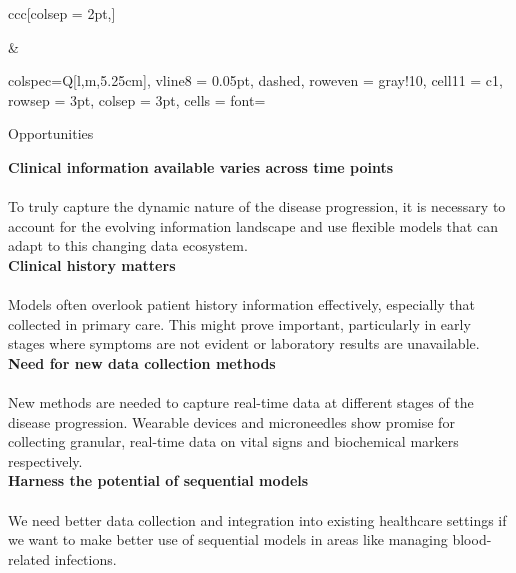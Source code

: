 \begin{table*}[h!]
\begin{tblr}{ccc}[colsep = 2pt,]
\begin{tblr}[T]
          \bottomrule
           
        \end{tblr}

        &

        
        \begin{tblr}[T]{
            colspec={Q[l,m,5.25cm]},
            vline{8} = {0.05pt, dashed},
            row{even} = {gray!10},
            cell{1}{1} = {c1},
            rowsep = 3pt,
            colsep = 3pt,
            cells = {font=\fontsize{7}{8}\linespread{1.00}\selectfont}
         }

            \toprule
             Opportunities \\
            \midrule
            
            {\textbf{Clinical information available varies across time points} \\ \vspace{0.1cm} \\ To truly capture the dynamic nature of the disease progression, it is necessary to account for the evolving information landscape and use flexible models that can adapt to this changing data ecosystem.} \\

            {\textbf{Clinical history matters} \\ \vspace{0.1cm} \\ Models often overlook patient history information effectively, especially that collected in primary care. This might prove important, particularly in early stages where symptoms are not evident or laboratory results are unavailable.} \\
    
            {\textbf{Need for new data collection methods}  \\ \vspace{0.1cm} \\ New methods are needed to capture real-time data at different stages of the disease progression. Wearable devices and microneedles show promise for collecting granular, real-time data on vital signs and biochemical markers respectively.} \\ 
        
            {\textbf{Harness the potential of sequential models} \\ \vspace{0.1cm} \\ We need better data collection and integration into existing healthcare settings if we want to make better use of sequential models in areas like managing blood-related infections. } \\
            

\end{tblr}
\end{tblr}
\end{table*}
